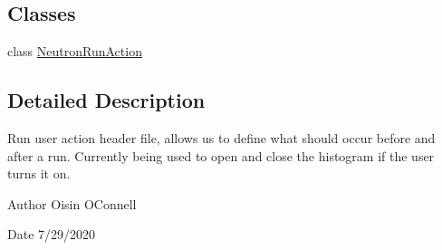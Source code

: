 \subsection*{Classes}
\begin{DoxyCompactItemize}
\item 
class \hyperlink{classNeutronRunAction}{Neutron\+Run\+Action}
\end{DoxyCompactItemize}


\subsection{Detailed Description}
Run user action header file, allows us to define what should occur before and after a run. Currently being used to open and close the histogram if the user turns it on. 

\begin{DoxyAuthor}{Author}
Oisin O\textquotesingle{}Connell 
\end{DoxyAuthor}
\begin{DoxyDate}{Date}
7/29/2020 
\end{DoxyDate}
